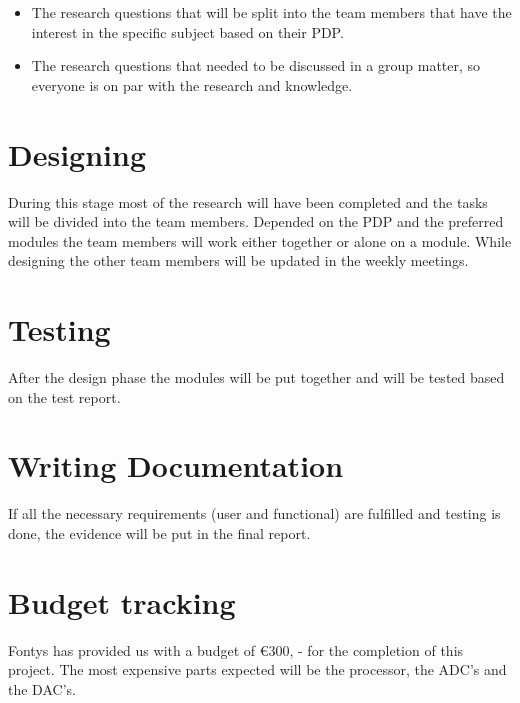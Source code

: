 \begin{itemize}
	\setlength\itemsep{-0.2em}
	\item The research questions that will be split into the team members that have the interest in the specific subject based on their PDP.
	\item The research questions that needed to be discussed in a group matter, so everyone is on par with the research and knowledge.
\end{itemize}


	\section{Designing}
	
During this stage most of the research will have been completed and the tasks will be divided into the team members. Depended on the PDP and the preferred modules the team members will work either together or alone on a module. While designing the other team members will be updated in the weekly meetings. 
	
	\section{Testing}
	
After the design phase the modules will be put together and will be tested based on the test report.
	
	\section{Writing Documentation}
	
If all the necessary requirements (user and functional) are fulfilled and testing is done, the evidence will be put in the final report.
	
	\section{Budget tracking}
	
Fontys has provided us with a budget of €300, - for the completion of this project. The most expensive parts expected will be the processor, the ADC’s and the DAC’s.


	